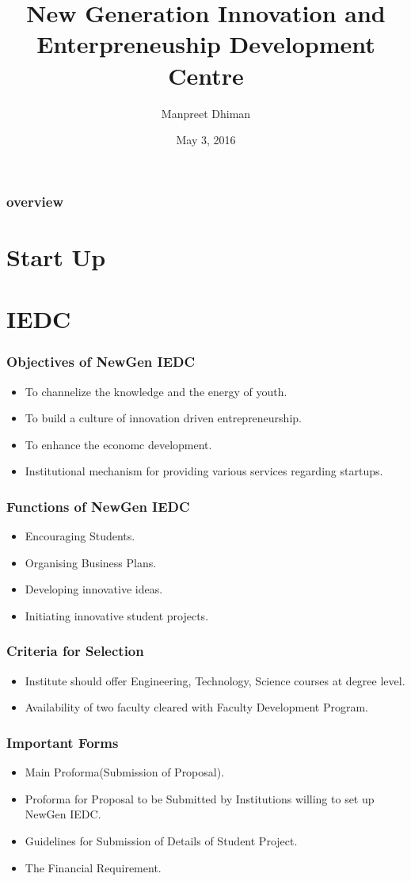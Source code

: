 \documentclass{beamer}
\title{New Generation Innovation and Enterpreneuship Development Centre}
\author{Manpreet Dhiman}
\institute{G.N.D.E.C, LDH}
\date{May 3, 2016}
\begin{document}
\begin{frame}
\titlepage
\end{frame}

\begin{frame}
\frametitle{overview}
\tableofcontents
\end{frame}
\section{Start Up}
\section{IEDC}
\begin{frame}
\frametitle{Objectives of NewGen IEDC}
\begin{itemize}
\item To channelize the knowledge and the energy of youth.
\item To build a culture of innovation driven entrepreneurship.
\item To enhance the economc development.
\item Institutional mechanism for providing various services regarding startups.
\end{itemize}
\end{frame}
\begin{frame}
\frametitle{Functions of NewGen IEDC}
\begin{itemize}
\item Encouraging Students.
\item Organising Business Plans.
\item Developing innovative ideas.
\item Initiating innovative student projects.
\end{itemize}
\end{frame}

\begin{frame}
\frametitle{Criteria for Selection}
\begin{itemize}
\item Institute should offer Engineering, Technology, Science courses at degree level.
\item Availability of two faculty cleared with Faculty Development Program.
\end{itemize}
\end{frame}
\begin{frame}
\frametitle{Important Forms}
\begin{itemize}
\item Main Proforma(Submission of Proposal).
\item Proforma for Proposal to be Submitted by Institutions willing to set up NewGen IEDC.
\item Guidelines for Submission of Details of Student Project.
\item The Financial Requirement.
\end{itemize}
\end{frame}

\begin{frame}
\Huge {}
\end{frame}
\end{document}
